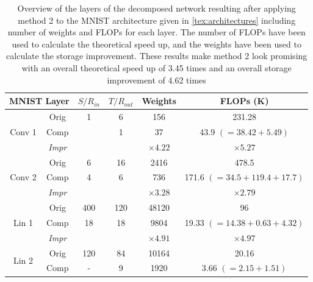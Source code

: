 \begin{table}
\centering
\small
\caption{Overview of the layers of the decomposed network resulting after applying method 2 to the MNIST architecture given in \autoref{tex:architectures} including number of weights and FLOPs for each layer. The number of FLOPs have been used to calculate the theoretical speed up, and the weights have been used to calculate the storage improvement. These results make method 2 look promising with an overall theoretical speed up of 3.45 times and an overall storage improvement of 4.62 times}
\label{tab:res_MNIST_FLOPs}
\begin{tabular}{cc|cccc}
\multicolumn{2}{c}{\textbf{MNIST Layer}} & $ S / R_{in}$ & $ T /R_{out}$ & Weights         & FLOPs (K)                  \\ \hline
\multirow{3}{*}{Conv 1}  & Orig          & 1             & 6             & 156             & 231.28                     \\
                         & Comp          &               & 1             & 37              & 43.9 $(=38.42+5.49)$       \\
                         & \textit{Impr} &               &               & $ \times 4.22$  & $\times 5.27$              \\ \hline
\multirow{3}{*}{Conv 2}  & Orig          & 6             & 16            & 2416            & 478.5                      \\
                         & Comp          & 4             & 6             & 736             & 171.6 $(=34.5+119.4+17.7)$ \\
                         & \textit{Impr} &               &               & $ \times 3.28$  & $\times 2.79$              \\ \hline
\multirow{3}{*}{Lin 1}   & Orig          & 400           & 120           & 48120           & 96                         \\
                         & Comp          & 18            & 18            & 9804            & 19.33 $(=14.38+0.63+4.32)$ \\
                         & \textit{Impr} &               &               & $ \times 4.91$  & $\times 4.97$              \\ \hline
\multirow{3}{*}{Lin 2}   & Orig          & 120           & 84            & 10164           & 20.16                      \\
                         & Comp          & -             & 9             & 1920            & 3.66 $(=2.15+1.51)$        \\

\end{tabular}
\end{table}
